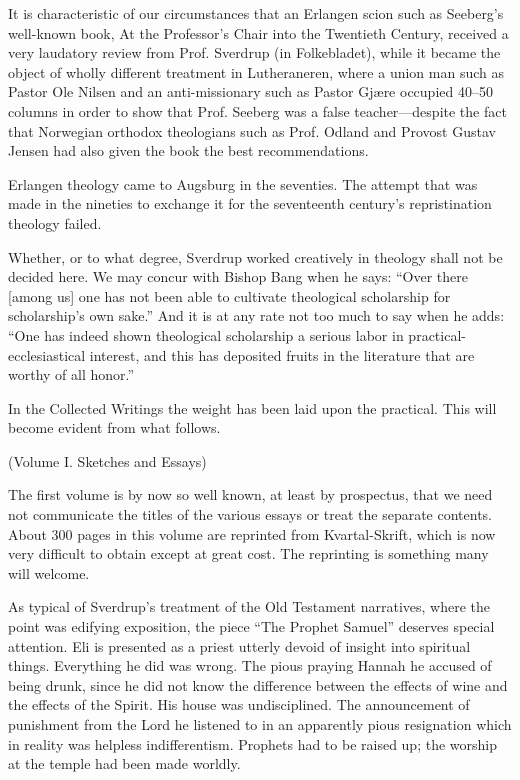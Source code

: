 It is characteristic of our circumstances that an Erlangen scion such as Seeberg’s well-known book, At the Professor’s Chair into the Twentieth Century, received a very laudatory review from Prof. Sverdrup (in Folkebladet), while it became the object of wholly different treatment in Lutheraneren, where a union man such as Pastor Ole Nilsen and an anti-missionary such as Pastor Gjære occupied 40–50 columns in order to show that Prof. Seeberg was a false teacher—despite the fact that Norwegian orthodox theologians such as Prof. Odland and Provost Gustav Jensen had also given the book the best recommendations.

Erlangen theology came to Augsburg in the seventies. The attempt that was made in the nineties to exchange it for the seventeenth century’s repristination theology failed.

Whether, or to what degree, Sverdrup worked creatively in theology shall not be decided here. We may concur with Bishop Bang when he says: “Over there [among us] one has not been able to cultivate theological scholarship for scholarship’s own sake.” And it is at any rate not too much to say when he adds: “One has indeed shown theological scholarship a serious labor in practical-ecclesiastical interest, and this has deposited fruits in the literature that are worthy of all honor.”

In the Collected Writings the weight has been laid upon the practical. This will become evident from what follows.

(Volume I. Sketches and Essays)

The first volume is by now so well known, at least by prospectus, that we need not communicate the titles of the various essays or treat the separate contents. About 300 pages in this volume are reprinted from Kvartal-Skrift, which is now very difficult to obtain except at great cost. The reprinting is something many will welcome.

As typical of Sverdrup’s treatment of the Old Testament narratives, where the point was edifying exposition, the piece “The Prophet Samuel” deserves special attention. Eli is presented as a priest utterly devoid of insight into spiritual things. Everything he did was wrong. The pious praying Hannah he accused of being drunk, since he did not know the difference between the effects of wine and the effects of the Spirit. His house was undisciplined. The announcement of punishment from the Lord he listened to in an apparently pious resignation which in reality was helpless indifferentism. Prophets had to be raised up; the worship at the temple had been made worldly.

